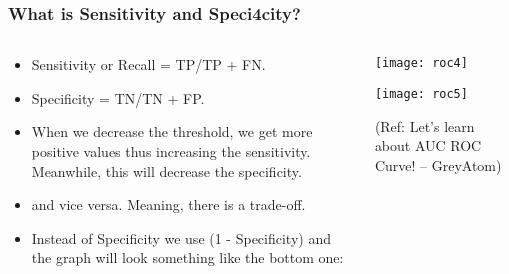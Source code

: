 \begin{frame}[fragile]\frametitle{What is Sensitivity and Speci4city?}

\begin{columns}
\begin{column}[T]{0.5\linewidth}
\begin{itemize}
\item Sensitivity or Recall = TP/TP + FN.
\item Specificity = TN/TN + FP.
\item When we decrease the threshold, we get more positive values thus
increasing the sensitivity. Meanwhile, this will decrease the specificity.
\item and vice versa. Meaning, there is a trade-off.
\item  Instead
of Specificity we use (1 - Specificity) and the graph will look something
like the bottom one:
\end{itemize}
\end{column}
\begin{column}[T]{0.5\linewidth}

\begin{center}
\texttt{[image: roc4]}

\texttt{[image: roc5]}
\end{center}

\tiny{(Ref: Let's learn about AUC ROC Curve! – GreyAtom)}
\end{column}

\end{columns}
\end{frame}

